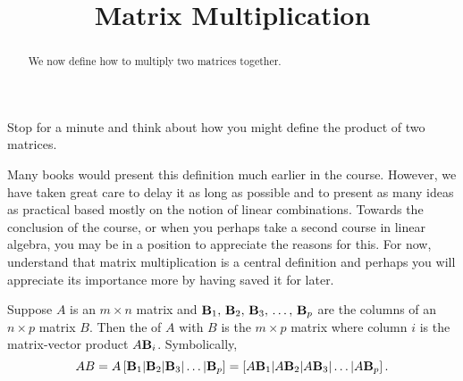 \documentclass{ximera}
\title{Matrix Multiplication}
\begin{document}
\begin{abstract}
  We now define how to multiply two matrices together.  
\end{abstract}
\maketitle

Stop for a minute and think about how you might define the product of
two matrices.

Many books would present this definition much earlier in the course.
However, we have taken great care to delay it as long as possible and
to present as many ideas as practical based mostly on the notion of
linear combinations.  Towards the conclusion of the course, or when
you perhaps take a second course in linear algebra, you may be in a
position to appreciate the reasons for this.  For now, understand that
matrix multiplication is a central definition and perhaps you will
appreciate its importance more by having saved it for later.

\begin{definition}
  Suppose $A$ is an $m\times n$ matrix and $\mathbf{B}_{1},\,\mathbf{B}_{2},\,\mathbf{B}_{3},\,\ldots,\,\mathbf{B}_{p}$ are the
  columns of an $n\times p$ matrix $B$.  Then the 
  of $A$ with $B$ is the $m\times p$ matrix where column $i$ is the
  matrix-vector product $A\mathbf{B}_i$.  Symbolically,
  \[
    AB=A\left\lbrack\mathbf{B}_{1}|\mathbf{B}_{2}|\mathbf{B}_{3}|\ldots|\mathbf{B}_{p}\right\rbrack=\left[A\mathbf{B}_1|A\mathbf{B}_2|A\mathbf{B}_3|\ldots|A\mathbf{B}_p\right].
  \]
\end{definition}
\end{document}
